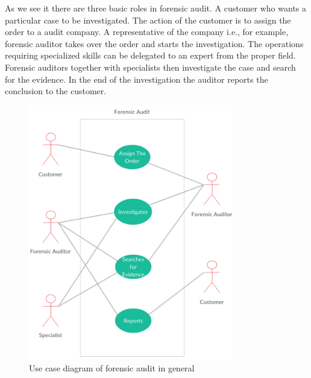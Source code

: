 As we see it there are three basic roles in forensic audit. A customer who wants a particular case to be investigated. The action of the customer is to assign the order to a audit company. A representative of the company i.e., for example, forensic auditor takes over the order and starts the investigation. The operations requiring specialized skills can be delegated to an expert from the proper field. Forensic auditors together with specialists then investigate the case and search for the evidence. In the end of the investigation the auditor reports the conclusion to the customer. 

\begin{figure}[h]
	\begin{center} 
	\includegraphics[width=0.8\textwidth]{img/usecase/use_case-FA_general2.pdf}
	\end{center}
	\caption{Use case diagram of forensic audit in general}
\end{figure}


